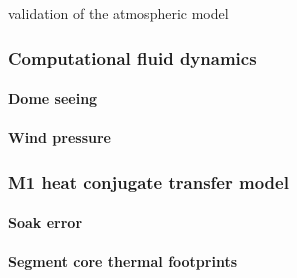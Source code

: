 \documentclass{gmto}
\begin{document}
validation of the atmospheric model\cite{GMT.DOC.01862}


\subsubsection{Computational fluid dynamics}
\label{sec:cfd}

\paragraph{Dome seeing}

\paragraph{Wind pressure}

\cite{GMTO.DOC.03352}

\subsubsection{M1 heat conjugate transfer model}
\label{sec:m1-hct}

\cite{GMT.DOC.04558,GMT.DOC.04557,GMT.DOC.04894}
\paragraph{Soak error}

\paragraph{Segment core thermal footprints}



\clearpage

\printbibliography
\end{document}
